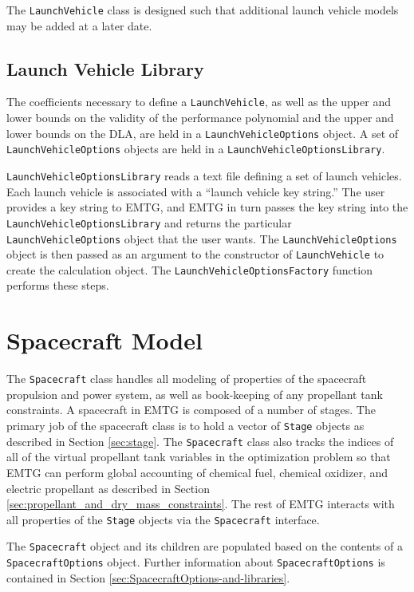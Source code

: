 The \texttt{LaunchVehicle} class is designed such that additional launch vehicle models may be added at a later date.

\subsection{Launch Vehicle Library}
\label{subsec:LaunchVehicleLibrary}

The coefficients necessary to define a \texttt{LaunchVehicle}, as well as the upper and lower bounds on the validity of the performance polynomial and the upper and lower bounds on the \ac{DLA}, are held in a \texttt{LaunchVehicleOptions} object. A set of \texttt{LaunchVehicleOptions} objects are held in a \texttt{LaunchVehicleOptionsLibrary}.

\texttt{LaunchVehicleOptionsLibrary} reads a text file defining a set of launch vehicles. Each launch vehicle is associated with a ``launch vehicle key string.'' The user provides a key string to \ac{EMTG}, and \ac{EMTG} in turn passes the key string into the \texttt{LaunchVehicleOptionsLibrary} and returns the particular \texttt{LaunchVehicleOptions} object that the user wants. The \texttt{LaunchVehicleOptions} object is then passed as an argument to the constructor of \texttt{LaunchVehicle} to create the calculation object. The \texttt{LaunchVehicleOptionsFactory} function performs these steps.

\section{Spacecraft Model}
\label{sec:spacecraft}

The \texttt{Spacecraft} class handles all modeling of properties of the spacecraft propulsion and power system, as well as book-keeping of any propellant tank constraints. A spacecraft in \ac{EMTG} is composed of a number of stages. The primary job of the spacecraft class is to hold a vector of \texttt{Stage} objects as described in Section \ref{sec:stage}. The \texttt{Spacecraft} class also tracks the indices of all of the virtual propellant tank variables in the optimization problem so that \ac{EMTG} can perform global accounting of chemical fuel, chemical oxidizer, and electric propellant as described in Section \ref{sec:propellant_and_dry_mass_constraints}. The rest of \ac{EMTG} interacts with all properties of the \texttt{Stage} objects via the \texttt{Spacecraft} interface.

The \texttt{Spacecraft} object and its children are populated based on the contents of a \texttt{SpacecraftOptions} object. Further information about \texttt{SpacecraftOptions} is contained in Section \ref{sec:SpacecraftOptions-and-libraries}.

